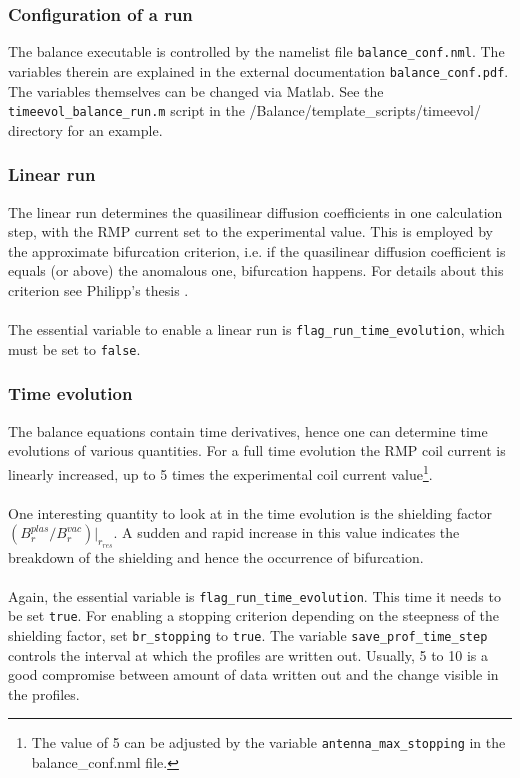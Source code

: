 \documentclass[11pt]{article}
\begin{document}
\subsubsection{Configuration of a run}
The balance executable is controlled by the namelist file \texttt{balance\_conf.nml}. The variables therein are explained in the external documentation \texttt{balance\_conf.pdf}. The variables themselves can be changed via Matlab. See the \texttt{timeevol\_balance\_run.m} script in the /Balance/template\_scripts/timeevol/ directory for an example.

\subsubsection{Linear run}
The linear run determines the quasilinear diffusion coefficients in one calculation step, with the RMP current set to the experimental value. This is employed by the approximate bifurcation criterion, i.e. if the quasilinear diffusion coefficient is equals (or above) the anomalous one, bifurcation happens. For details about this criterion see Philipp's thesis \cite{philippmaster}.\\\\
The essential variable to enable a linear run is \texttt{flag\_run\_time\_evolution}, which must be set to \texttt{false}.

\subsubsection{Time evolution}
The balance equations contain time derivatives, hence one can determine time evolutions of various quantities. For a full time evolution the RMP coil current is linearly increased, up to 5 times the experimental coil current value\footnote{The value of 5 can be adjusted by the variable \texttt{antenna\_max\_stopping} in the balance\_conf.nml file.}.\\\\
One interesting quantity to look at in the time evolution is the shielding factor $(B_r^{plas}/B_r^{vac})|_{r_{res}}$. A sudden and rapid increase in this value indicates the breakdown of the shielding and hence the occurrence of bifurcation.\\\\
Again, the essential variable is \texttt{flag\_run\_time\_evolution}. This time it needs to be set \texttt{true}. For enabling a stopping criterion depending on the steepness of the shielding factor, set \texttt{br\_stopping} to \texttt{true}. The variable \texttt{save\_prof\_time\_step} controls the interval at which the profiles are written out. Usually, 5 to 10 is a good compromise between amount of data written out and the change visible in the profiles.
\end{document}
